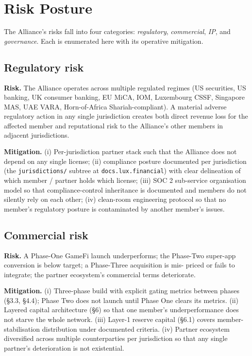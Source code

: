 \section{Risk Posture}

The Alliance's risks fall into four categories: \emph{regulatory},
\emph{commercial}, \emph{IP}, and \emph{governance}. Each is enumerated
here with its operative mitigation.

\subsection{Regulatory risk}

\textbf{Risk.} The Alliance operates across multiple regulated regimes
(US securities, US banking, UK consumer banking, EU MiCA, IOM, Luxembourg
CSSF, Singapore MAS, UAE VARA, Horn-of-Africa Shariah-compliant). A
material adverse regulatory action in any single jurisdiction creates
both direct revenue loss for the affected member and reputational risk
to the Alliance's other members in adjacent jurisdictions.

\textbf{Mitigation.} (i) Per-jurisdiction partner stack such that the
Alliance does not depend on any single license; (ii) compliance posture
documented per jurisdiction (the \texttt{jurisdictions/} subtree at
\texttt{docs.lux.financial}) with clear delineation of which member /
partner holds which license; (iii) SOC 2 sub-service organisation model
so that compliance-control inheritance is documented and members do not
silently rely on each other; (iv) clean-room engineering protocol so
that no member's regulatory posture is contaminated by another member's
issues.

\subsection{Commercial risk}

\textbf{Risk.} A Phase-One GameFi launch underperforms; the Phase-Two
super-app conversion is below target; a Phase-Three acquisition is mis-
priced or fails to integrate; the partner ecosystem's commercial terms
deteriorate.

\textbf{Mitigation.} (i) Three-phase build with explicit gating metrics
between phases (\S 3.3, \S 4.4); Phase Two does not launch until Phase
One clears its metrics. (ii) Layered capital architecture (\S 6) so that
one member's underperformance does not starve the whole network.
(iii) Layer-1 reserve capital (\S 6.1) covers member-stabilisation
distribution under documented criteria. (iv) Partner ecosystem
diversified across multiple counterparties per jurisdiction so that any
single partner's deterioration is not existential.

